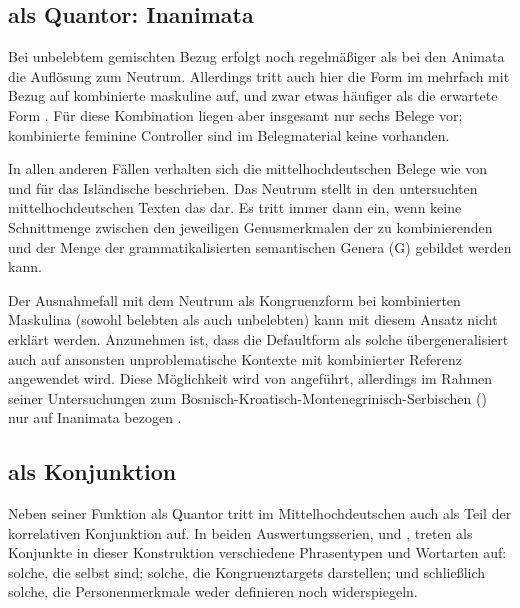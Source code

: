 
\subsection{ als Quantor: Inanimata}

Bei unbelebtem gemischten Bezug erfolgt noch regelmäßiger als bei den
Animata die Auflösung zum Neutrum. Allerdings
tritt auch hier die Form  im \CAO{} mehrfach mit Bezug auf
kombinierte maskuline  auf, und zwar etwas häufiger als die
erwartete Form . Für diese Kombination liegen aber insgesamt nur
sechs Belege vor; kombinierte feminine Controller sind im Belegmaterial keine
vorhanden.

In allen anderen Fällen verhalten sich die
mittelhochdeutschen Belege wie von
\citet{wechslerzlatic2003} und \citet{wechsler2009} für das
Isländische beschrieben. Das Neutrum stellt in den untersuchten
mittelhochdeutschen Texten das  dar. Es
tritt immer dann ein, wenn keine Schnittmenge zwischen den jeweiligen
Genusmerkmalen der zu kombinierenden  und der
Menge der grammatikalisierten semantischen
Genera (G) gebildet werden kann.

Der Ausnahmefall mit dem Neutrum als Kongruenzform bei
kombinierten Maskulina (sowohl belebten als auch unbelebten) kann
mit diesem Ansatz nicht erklärt werden. Anzunehmen ist, dass die
Defaultform als solche übergeneralisiert
auch auf ansonsten unproblematische Kontexte mit kombinierter Referenz
angewendet wird. Diese Möglichkeit wird von \citet[302]{corbett1991} angeführt,
allerdings im Rahmen seiner Untersuchungen zum
Bosnisch-\allowbreak{}Kroatisch-\allowbreak{}Montenegrinisch-\allowbreak{}Serbischen
() nur auf Inanimata bezogen
\autocites[vergleiche auch][190]{wechslerzlatic2003}[581]{wechsler2009}.


\subsection{ als Konjunktion}

Neben seiner Funktion als Quantor tritt  im
Mittelhochdeutschen auch als Teil der korrelativen
Konjunktion   auf. In
beiden Auswertungs\-serien, \CAO{} und \KC{}, treten als Konjunkte in dieser
Konstruktion verschiedene Phrasen\-typen und Wort\-arten auf: solche, die
selbst  sind; solche, die Kongruenztargets
darstellen; und schließlich solche, die Personenmerkmale weder definieren noch
widerspiegeln.

